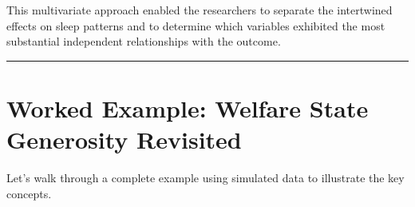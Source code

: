 \documentclass[
  letterpaper,
  DIV=11,
  numbers=noendperiod]{scrreprt}
\begin{document}
This multivariate approach enabled the researchers to separate the
intertwined effects on sleep patterns and to determine which variables
exhibited the most substantial independent relationships with the
outcome.

\begin{center}\rule{0.5\linewidth}{0.5pt}\end{center}

\section{Worked Example: Welfare State Generosity
Revisited}\label{worked-example-welfare-state-generosity-revisited}

Let's walk through a complete example using simulated data to illustrate
the key concepts.
\end{document}
